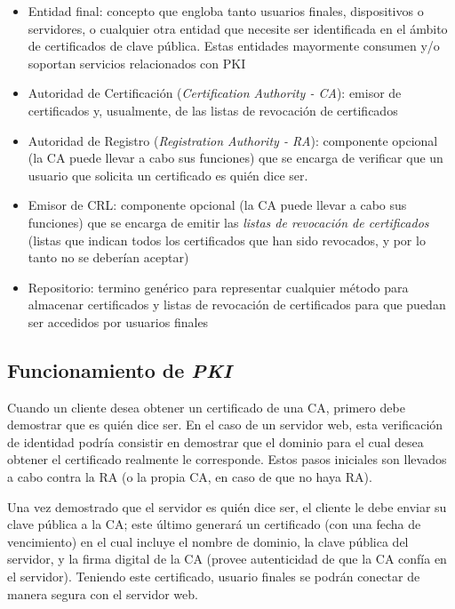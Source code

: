 \begin{itemize}
    \item Entidad final: concepto que engloba tanto usuarios finales, dispositivos o servidores, o cualquier otra entidad que necesite ser identificada en el ámbito de certificados de clave pública. Estas entidades mayormente consumen y/o soportan servicios relacionados con PKI
    \item Autoridad de Certificación (\emph{Certification Authority - CA}): emisor de certificados y, usualmente, de las listas de revocación de certificados
    \item Autoridad de Registro (\emph{Registration Authority - RA}): componente opcional (la CA puede llevar a cabo sus funciones) que se encarga de verificar que un usuario que solicita un certificado es quién dice ser.
    \item Emisor de CRL: componente opcional (la CA puede llevar a cabo sus funciones) que se encarga de emitir las \emph{listas de revocación de certificados} (listas que indican todos los certificados que han sido revocados, y por lo tanto no se deberían aceptar)
    \item Repositorio: termino genérico para representar cualquier método para almacenar certificados y listas de revocación de certificados para que puedan ser accedidos por usuarios finales
\end{itemize}

\subsection{Funcionamiento de \emph{PKI}}

Cuando un cliente desea obtener un certificado de una CA, primero debe demostrar que es quién dice ser. En el caso de un servidor web, esta verificación de identidad podría consistir en demostrar que el dominio para el cual desea obtener el certificado realmente le corresponde. Estos pasos iniciales son llevados a cabo contra la RA (o la propia CA, en caso de que no haya RA).

Una vez demostrado que el servidor es quién dice ser, el cliente le debe enviar su clave pública a la CA; este último generará un certificado (con una fecha de vencimiento) en el cual incluye el nombre de dominio, la clave pública del servidor, y la firma digital de la CA (provee autenticidad de que la CA confía en el servidor). Teniendo este certificado, usuario finales se podrán conectar de manera segura con el servidor web.

